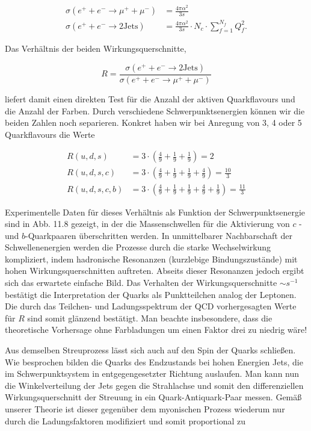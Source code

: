 \documentclass[10pt, letterpaper]{article}
\begin{document}
$$
\begin{aligned}
\sigma\left(e^{+}+e^{-} \rightarrow \mu^{+}+\mu^{-}\right) & =\frac{4 \pi \alpha^{2}}{3 s} \\
\sigma\left(e^{+}+e^{-} \rightarrow 2 \mathrm{Jets}\right) & =\frac{4 \pi \alpha^{2}}{3 s} \cdot N_{c} \cdot \sum_{f=1}^{N_{f}} Q_{f}^{2} .
\end{aligned}
$$

Das Verhältnis der beiden Wirkungsquerschnitte,

$$
R=\frac{\sigma\left(e^{+}+e^{-} \rightarrow 2 \mathrm{Jets}\right)}{\sigma\left(e^{+}+e^{-} \rightarrow \mu^{+}+\mu^{-}\right)}
$$

liefert damit einen direkten Test für die Anzahl der aktiven Quarkflavours und die Anzahl der Farben. Durch verschiedene Schwerpunktsenergien können wir die beiden Zahlen noch separieren. Konkret haben wir bei Anregung von 3, 4 oder 5 Quarkflavours die Werte

$$
\begin{aligned}
R(u, d, s) & =3 \cdot\left(\frac{4}{9}+\frac{1}{9}+\frac{1}{9}\right)=2 \\
R(u, d, s, c) & =3 \cdot\left(\frac{4}{9}+\frac{1}{9}+\frac{1}{9}+\frac{4}{9}\right)=\frac{10}{3} \\
R(u, d, s, c, b) & =3 \cdot\left(\frac{4}{9}+\frac{1}{9}+\frac{1}{9}+\frac{4}{9}+\frac{1}{9}\right)=\frac{11}{3}
\end{aligned}
$$

Experimentelle Daten für dieses Verhältnis als Funktion der Schwerpunktsenergie sind in Abb. 11.8 gezeigt, in der die Massenschwellen für die Aktivierung von $c$ - und $b$-Quarkpaaren überschritten werden. In unmittelbarer Nachbarschaft der Schwellenenergien werden die Prozesse durch die starke Wechselwirkung kompliziert, indem hadronische Resonanzen (kurzlebige Bindungszustände) mit hohen Wirkungsquerschnitten auftreten. Abseits dieser Resonanzen jedoch ergibt sich das erwartete einfache Bild. Das Verhalten der Wirkungsquerschnitte $\sim s^{-1}$ bestätigt die Interpretation der Quarks als Punktteilchen analog der Leptonen. Die durch das Teilchen- und Ladungsspektrum der QCD vorhergesagten Werte für $R$ sind somit glänzend bestätigt. Man beachte insbesondere, dass die theoretische Vorhersage ohne Farbladungen um einen Faktor drei zu niedrig wäre!

Aus demselben Streuprozess lässt sich auch auf den Spin der Quarks schließen. Wie besprochen bilden die Quarks des Endzustands bei hohen Energien Jets, die im Schwerpunktsystem in entgegengesetzter Richtung auslaufen. Man kann nun die Winkelverteilung der Jets gegen die Strahlachse und somit den differenziellen Wirkungsquerschnitt der Streuung in ein Quark-Antiquark-Paar messen. Gemäß unserer Theorie ist dieser gegenüber dem myonischen Prozess wiederum nur durch die Ladungsfaktoren modifiziert und somit proportional zu
\end{document}
